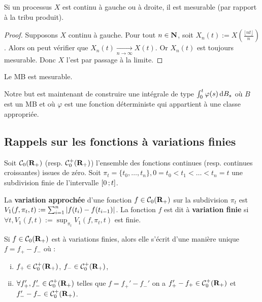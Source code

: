 	\begin{pop}
		Si un processus $X$ est continu à gauche ou à droite, il est mesurable (par rapport à la tribu produit).
	\end{pop}
	
	\begin{proof}
		Supposons $X$ continu à gauche.
		Pour tout $n \in \mathbf{N}$, soit $X_n(t) := X \left( \frac{\lfloor nt \rfloor}{n} \right)$.
		Alors on peut vérifier que $X_n(t) \underset{n \to \infty}{\longrightarrow} X(t)$.
		Or $X_n(t)$ est toujours mesurable.
		Donc $X$ l'est par passage à la limite.
	\end{proof}
	
	\begin{cor}
		Le MB est mesurable.
	\end{cor}

	Notre but est maintenant de construire une intégrale de type $\int_0^t \varphi(s) \mathop{}\mathopen{}\mathrm{d} B_s$ où $B$ est un MB et où $\varphi$ est une fonction déterministe qui appartient à une classe appropriée.


\subsection{Rappels sur les fonctions à variations finies}

	Soit $\mathcal{C}_0(\mathbf{R}_+)$ (resp. $\mathcal{C}_0^+(\mathbf{R}_+)$) l'ensemble des fonctions continues (resp. continues croissantes) issues de zéro.
	Soit $\pi_t = \{ t_0,\ldots,t_n \}, 0 = t_0 < t_1 < \ldots < t_n = t$ une subdivision finie de l'intervalle $\mathopen{}\mathclose{\left[0\mathclose{}\mathpunct{};t\right]}$.
	
	\begin{defn}
		La \textbf{variation approchée} d'une fonction $f \in \mathcal{C}_0(\mathbf{R}_+)$ sur la subdivision $\pi_t$ est $V_1(f,\pi_t,t) := \sum_{i = 1}^n \left\lvert f(t_i) - f(t_{i - 1})\right\rvert$.
		La fonction $f$ est dit à \textbf{variation finie} si $\forall t, V_1(f,t) := \sup_{\pi_t} V_1(f,\pi_t,t)$ est finie.
	\end{defn}
	
	\begin{pop}
		Si $f \in \mathcal{C}_0(\mathbf{R}_+)$ est à variations finies, alors elle s'écrit d'une manière unique $f = f_+ - f_-$ où :
		\begin{enumerate}[(i)]
			\item $f_+ \in \mathcal{C}_0^+(\mathbf{R}_+)$, $f_- \in \mathcal{C}_0^+(\mathbf{R}_+)$,
			\item $\forall f_+',f_-' \in \mathcal{C}_0^+(\mathbf{R}_+)$ telles que $f = f_+' - f_-'$ on a $f_+' - f_+ \in \mathcal{C}_0^+(\mathbf{R}_+)$ et $f_-' - f_- \in \mathcal{C}_0^+(\mathbf{R}_+)$.
		\end{enumerate}
	\end{pop}
	
